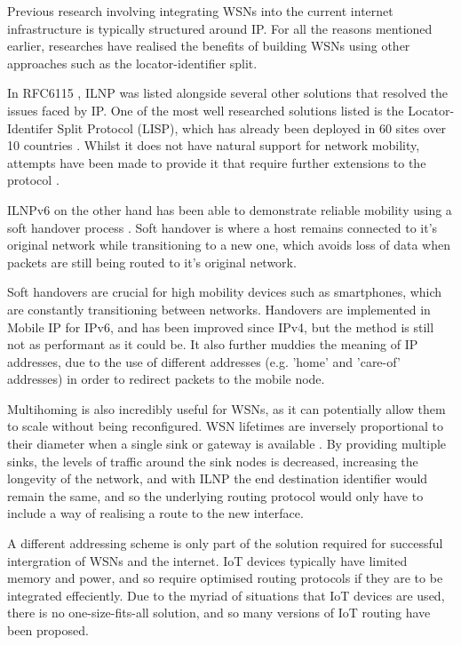 \documentclass[12pt]{article}
\begin{document}
Previous research involving integrating WSNs into the current internet infrastructure is typically structured around IP. For all the reasons mentioned earlier, researches have realised the benefits of building WSNs using other approaches such as the locator-identifier split.

In RFC6115 \cite{rfc6115}, ILNP was listed alongside several other solutions that resolved the issues faced by IP. One of the most well researched solutions listed is the Locator-Identifer Split Protocol (LISP), which has already been deployed in 60 sites over 10 countries \cite{nahla}. Whilst it does not have natural support for network mobility, attempts have been made to provide it that require further extensions to the protocol \cite{moblisp}. 

ILNPv6 on the other hand has been able to demonstrate reliable mobility using a soft handover process \cite{shilnp}. Soft handover is where a host remains connected to it's original network while transitioning to a new one, which avoids loss of data when packets are still being routed to it's original network. 

Soft handovers are crucial for high mobility devices such as smartphones, which are constantly transitioning between networks. Handovers are implemented in Mobile IP for IPv6, and has been improved since IPv4, but the method is still not as performant as it could be. It also further muddies the meaning of IP addresses, due to the use of different addresses (e.g. 'home' and 'care-of' addresses) in order to redirect packets to the mobile node. 

Multihoming is also incredibly useful for WSNs, as it can potentially allow them to scale without being reconfigured. WSN lifetimes are inversely proportional to their diameter when a single sink or gateway is available \cite{multisink}. By providing multiple sinks, the levels of traffic around the sink nodes is decreased, increasing the longevity of the network, and with ILNP the end destination identifier would remain the same, and so the underlying routing protocol would only have to include a way of realising a route to the new interface.

A different addressing scheme is only part of the solution required for successful intergration of WSNs and the internet. IoT devices typically have limited memory and power, and so require optimised routing protocols if they are to be integrated effeciently. Due to the myriad of situations that IoT devices are used, there is no one-size-fits-all solution, and so many versions of IoT routing have been proposed.
\end{document}

